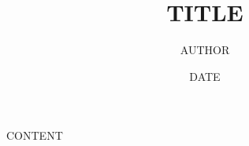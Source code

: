 \documentclass[11pt]{article}
\title{ TITLE}
\author{ AUTHOR }
\date{ DATE }
\begin{document}
\maketitle
\pagebreak



CONTENT

\end{document}

